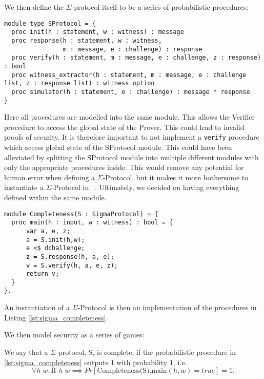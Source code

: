 We then define the $\Sigma$-protocol itself to be a series of probabilistic procedures:
\begin{lstlisting}[label=lst:sigma_procedures,caption= Abstract procedures of $\Sigma$-Protocols]
module type SProtocol = {
  proc init(h : statement, w : witness) : message
  proc response(h : statement, w : witness,
                m : message, e : challenge) : response
  proc verify(h : statement, m : message, e : challenge, z : response) : bool
  proc witness_extractor(h : statement, m : message, e : challenge list, z : response list) : witness option
  proc simulator(h : statement, e : challenge) : message * response
}
\end{lstlisting}

Here all procedures are modelled into the same module. This allows the
Verifier procedure to access the global state of the Prover. This could lead to
invalid proofs of security. It is therefore important to not implement a
\texttt{verify} procedure which access global state of the SProtocol module.
This could have been alleviated by splitting the SProtocol module into multiple
different modules with only the appropriate procedures inside. This would remove
any potential for human error when defining a $\Sigma$-Protocol, but it makes it
more bothersome to instantiate a $\Sigma$-Protocol in \easycrypt\ . Ultimately,
we decided on having everything defined within the same module.


\begin{lstlisting}[float, label=lst:sigma_completeness,caption=Completeness game for $\Sigma$-Protocols]
module Completeness(S : SigmaProtocol) = {
  proc main(h : input, w : witness) : bool = {
      var a, e, z;
      a = S.init(h,w);
      e <$ dchallenge;
      z = S.response(h, a, e);
      v = S.verify(h, a, e, z);
      return v;
  }
}.
\end{lstlisting}

An instantiation of a $\Sigma$-Protocol is then an implementation of the
procedures in Listing \ref{lst:sigma_completeness}.

We then model security as a series of games:

\begin{definition}[Completeness]
\label{def:sigma:completeness}
  We say that a $\Sigma$-protocol, S, is complete, if the probabilistic procedure in
  \ref{lst:sigma_completeness} outputs 1 with probability 1, i.e.
  \begin{equation}
    \label{eq:sigma_completeness}
    \forall h \; w, \text{R } h \; w \implies Pr[\text{Completeness(S).main}(h,w) = true] = 1.
  \end{equation}
\end{definition}

